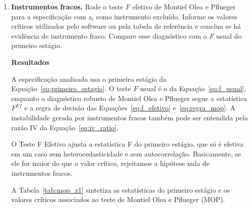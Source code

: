 \documentclass[12pt,a4paper]{article}
\begin{document}
\begin{enumerate}[label=\textbf{\arabic*.}]
Apesar dessas observações, a validade dos instrumentos parece indicar um caminho contrário ao da ortogonalidade desejada. Isso, pelo fato de o modelo em b) apresentar estimativas consideravelmente precisas, mas com testes em sua maneira dúbios. No teste J de Hansen para o GMM de Z2, o resultado é uma estatística de 6,557 conjuntamente a um p-valor de 0,0104, o que, pela definição, ser menor que os 0,05 rejeita a hipótese nula do conjunto de instrumentos ser inteiramente exógeno. Por esse motivo, deve-se levar em conta que ao menos um dos instrumentos utilizados para análise é endógeno e, portanto, está correlacionado com o termo de erro, além de não ser possível afirmar em completude a adequação das especificações ao modelo.

\item \textbf{Instrumentos fracos.} Rode o teste $F$ efetivo de Montiel Olea e
    Pflueger para a especificação com $z_t$ como instrumento excluído. Informe os
    valores críticos utilizados pelo software ou pela tabela de referência e conclua
    se há evidência de instrumento fraco. Compare esse diagnóstico com o $F$ usual
    do primeiro estágio.
    
\textbf{Resultados}

A especificação analisada usa o primeiro estágio da Equação~\eqref{eq:primeiro_estagio}. O teste $F$ usual é o da Equação~\eqref{eq:f_usual}, enquanto o diagnóstico robusto de Montiel Olea e Pflueger segue a estatística $F^{Ef}$ e a regra de decisão das Equações~\eqref{eq:f_efetivo} e~\eqref{eq:regra_mop}. A instabilidade gerada por instrumentos fracos também pode ser entendida pela razão IV da Equação~\eqref{eq:iv_ratio}.

    O Teste F Efetivo ajusta a estatística F do primeiro estágio, que só é efetiva em um caso sem heterocedasticidade e sem autocorrelação. Basicamente, se ele for maior do que o valor crítico, rejeitamos a hipótese nula de instrumentos fracos.



A Tabela~\ref{tab:mop_z1} sintetiza as estatísticas do primeiro estágio e os valores críticos associados ao teste de Montiel Olea e Pflueger (MOP).


\end{enumerate}
\end{document}
